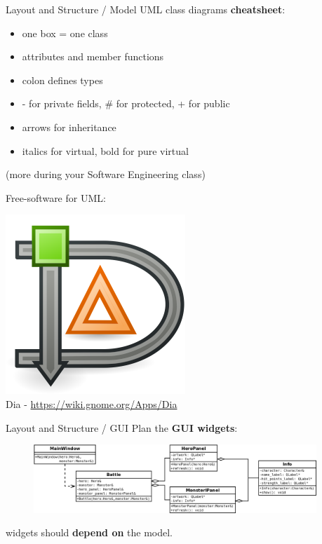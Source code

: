 \documentclass[11pt]{beamer}
\renewcommand{\emph}[1]{\textbf{#1}}
\begin{document}
\begin{frame}{Layout and Structure / Model}
 UML class diagrams \emph{cheatsheet}:
 \begin{itemize}
  \item one box = one class
  \item attributes and member functions
  \item colon defines types
  \item - for private fields, \# for protected, + for public
  \item arrows for inheritance
  \item italics for virtual, bold for pure virtual
 \end{itemize}
 {\scriptsize (more during your Software Engineering class)}
 
 Free-software for UML:
 \begin{center}
  \includegraphics[height=0.1\textheight]{assets/logo-dia}\\
  Dia - \url{https://wiki.gnome.org/Apps/Dia}
 \end{center}
\end{frame}

\begin{frame}{Layout and Structure / GUI}
 Plan the \emph{GUI widgets}:
 \begin{figure}
  \includegraphics[width=0.95\textwidth]{assets/diagram-battle-scene-gui}
 \end{figure}
 widgets should \emph{depend on} the model.
\end{frame}
\end{document}
